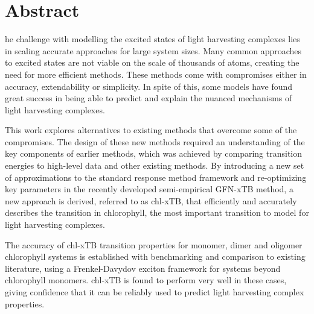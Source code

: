 %
%
%

\chapter*{Abstract}
\begin{SingleSpace}
he challenge with modelling the excited states of light harvesting complexes
lies in scaling accurate approaches for large system sizes. Many common approaches 
to excited states are not viable on the scale of thousands of atoms, creating the 
need for more efficient methods. These methods come with compromises either in accuracy,
extendability or simplicity. In spite of this, some models have found great success 
in being able to predict and explain the nuanced mechanisms of light harvesting
complexes. 

This work explores alternatives to existing methods that overcome some of the compromises.
The design of these new methods required an understanding of the key components of 
earlier methods, which was achieved by comparing transition energies to high-level 
data and other existing methods. By introducing a new set of approximations to the
standard response method framework and re-optimizing key parameters in the recently
developed semi-empirical GFN-xTB method, a new approach is derived, referred to 
as chl-xTB, that efficiently and accurately describes the \Qy transition in chlorophyll,
the most important transition to model for light harvesting complexes.

The accuracy of chl-xTB transition properties for monomer, dimer and oligomer chlorophyll
systems is established with benchmarking and comparison to existing literature,
using a Frenkel-Davydov exciton framework for systems beyond chlorophyll monomers.
chl-xTB is found to perform very well in these cases, giving confidence that it 
can be reliably used to predict light harvesting complex properties.


\end{SingleSpace}
